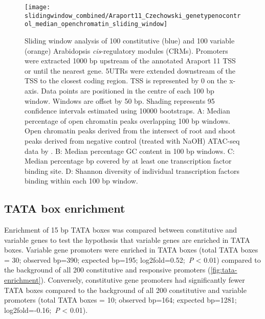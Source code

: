 \documentclass[../main.tex]{subfiles}
\begin{document}
\begin{figure}[!h]
	\begin{center}
		\capstart
		\texttt{[image: slidingwindow\_combined/Araport11\_Czechowski\_genetypenocontrol\_median\_openchromatin\_sliding\_window]}
		\caption{
			Sliding window analysis of 100 constitutive (blue) and 100 variable (orange) Arabidopsis \textit{cis}\hyp{}regulatory modules (CRMs). Promoters were extracted 1000 bp upstream of the annotated Araport 11 \autocite{chengAraport11CompleteReannotation2017} TSS or until the nearest gene.
			5UTRs were extended downstream of the TSS to the closest coding region.
			TSS is represented by 0 on the x-axis.
			Data points are positioned in the centre of each 100 bp window.
			Windows are offset by 50 bp.
			Shading represents 95 confidence intervals estimated using 10000 bootstraps.
			A: Median percentage of open chromatin peaks overlapping 100 bp windows. Open chromatin peaks derived from the intersect of root and shoot peaks derived from negative control (treated with NaOH) ATAC\hyp{}seq data by \textcite{potterCytokininModulatesContextdependent2018}.		
			B: Median percentage GC content in 100 bp windows.
			C: Median percentage bp covered by at least one transcription factor binding site.
			D: Shannon diversity of individual transcription factors binding within each 100 bp window.
			\label{fig:all-combined-sliding-window-araporttss}
		}
	\end{center}
\end{figure}

\subsection{TATA box enrichment}

Enrichment of 15 bp TATA boxes was compared between constitutive and
variable genes to test the hypothesis that variable genes are enriched in TATA boxes. Variable gene promoters were enriched in TATA boxes (total TATA boxes = 30; observed bp=390; expected bp=195; log2fold=0.52;~\textit{P} \textless{} 0.01) compared to the background of all 200 constitutive and responsive promoters
(\autoref{fig:tata-enrichment}). Conversely, constitutive gene
promoters had significantly fewer TATA boxes compared to the background of all 200 constitutive and variable promoters (total TATA boxes = 10; observed bp=164; expected bp=1281; log2fold=-0.16;~\textit{P} \textless{} 0.01).
\end{document}
